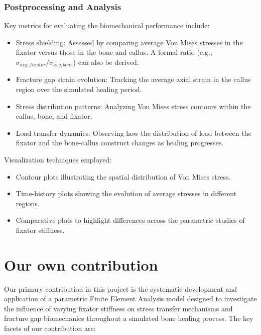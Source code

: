 \documentclass{article}
\begin{document}
\subsubsection{Postprocessing and Analysis}

Key metrics for evaluating the biomechanical performance include:
\begin{itemize}
  \item Stress shielding: Assessed by comparing average Von Mises stresses in the fixator versus those in the bone and callus. A formal ratio (e.g., $\sigma_{avg,fixator}/\sigma_{avg,bone}$) can also be derived.
  \item Fracture gap strain evolution: Tracking the average axial strain in the callus region over the simulated healing period.
  \item Stress distribution patterns: Analyzing Von Mises stress contours within the callus, bone, and fixator.
  \item Load transfer dynamics: Observing how the distribution of load between the fixator and the bone-callus construct changes as healing progresses.
\end{itemize}

Visualization techniques employed:
\begin{itemize}
  \item Contour plots illustrating the spatial distribution of Von Mises stress.
  \item Time-history plots showing the evolution of average stresses in different regions.
  \item Comparative plots to highlight differences across the parametric studies of fixator stiffness.
\end{itemize}


\section{Our own contribution}

Our primary contribution in this project is the systematic development and application of a parametric Finite Element Analysis model designed to investigate the influence of varying fixator stiffness on stress transfer mechanisms and fracture gap biomechanics throughout a simulated bone healing process. The key facets of our contribution are:
\end{document}
